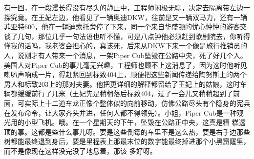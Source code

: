 \documentclass{article}
\begin{document}
\newpage

有一回，在一段漫长得没有尽头的静止中，工程师闲极无聊，决定去隔离带左边一探究竟。在王妃左边，他看见了一辆奥迪DKW，往前是又一辆双马力，还有一辆菲亚特600，他在一辆迪索托旁停了下来，同一个来自华盛顿的忧心忡忡的游客交谈了几句，那位几乎一句法语也听不懂，可是八点钟他必须赶到歌剧院去，你听得懂我的话吗，我老婆会担心的，真该死，后来从DKW下来一个像是旅行推销员的人，说刚才有人带来一个消息，一架Piper Cub坠毁在公路中央，死了好几个人。美国人对Piper Cub的事儿毫无兴趣，工程师也顾不上这消息了，因为这时他听见喇叭声响成一片，得赶紧回到标致404上，顺便把这些新闻传递给陶努斯上的两个男人和标致203上的那对夫妻。他把更详细的解释都留给了王妃上的姑娘，这时车辆都缓缓前行了几米（王妃先是稍稍落后标致404，过了一会儿又稍稍超到了前面，可实际上十二道车龙正像个整体似的向前移动，仿佛公路尽头有个隐身的宪兵在发布命令，让大家齐头并进，任何人都不得领先）。小姐，Piper Cub是一种观光用的小型飞机。哦。在一个星期天的下午，坠毁在公路正中央，这真是糟
\newpage
糕透顶的事。这都是些什么事儿呀。要是这些倒霉的车里不是这么热，要是右手边那些树都能最终退到身后，要是里程表上那最末位的数字能最终掉进那个小黑窟窿里，而不是像现在这样没完没了地悬着，那该
多好呀。 
\end{document}
